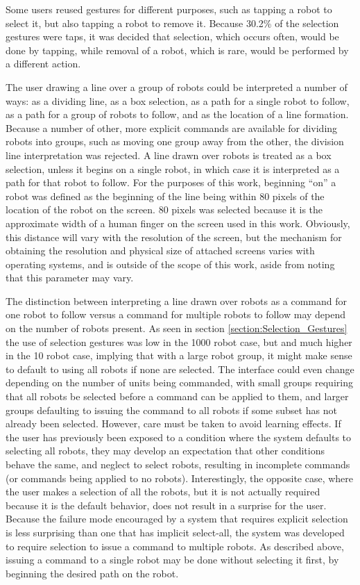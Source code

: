 Some users reused gestures for different purposes, such as tapping a robot to select it, but also tapping a robot to remove it.
Because 30.2\% of the selection gestures were taps, it was decided that selection, which occurs often, would be done by tapping, while removal of a robot, which is rare, would be performed by a different action. 

The user drawing a line over a group of robots could be interpreted a number of ways: as a dividing line, as a box selection, as a path for a single robot to follow, as a path for a group of robots to follow, and as the location of a line formation. 
Because a number of other, more explicit commands are available for dividing robots into groups, such as moving one group away from the other, the division line interpretation was rejected. 
A line drawn over robots is treated as a box selection, unless it begins on a single robot, in which case it is interpreted as a path for that robot to follow. 
For the purposes of this work, beginning ``on'' a robot was defined as the beginning of the line being within 80 pixels of the location of the robot on the screen. 
80 pixels was selected because it is the approximate width of a human finger on the screen used in this work. 
Obviously, this distance will vary with the resolution of the screen, but the mechanism for obtaining the resolution and physical size of attached screens varies with operating systems, and is outside of the scope of this work, aside from noting that this parameter may vary.

The distinction between interpreting a line drawn over robots as a command for one robot to follow versus a command for multiple robots to follow may depend on the number of robots present.
As seen in section \ref{section:Selection_Gestures} the use of selection gestures was low in the 1000 robot case, but and much higher in the 10 robot case, implying that with a large robot group, it might make sense to default to using all robots if none are selected. 
The interface could even change depending on the number of units being commanded, with small groups requiring that all robots be selected before a command can be applied to them, and larger groups defaulting to issuing the command to all robots if some subset has not already been selected. 
However, care must be taken to avoid learning effects. 
If the user has previously been exposed to a condition where the system defaults to selecting all robots, they may develop an expectation that other conditions behave the same, and neglect to select robots, resulting in incomplete commands (or commands being applied to no robots). 
Interestingly, the opposite case, where the user makes a selection of all the robots, but it is not actually required because it is the default behavior, does not result in a surprise for the user. 
Because the failure mode encouraged by a system that requires explicit selection is less surprising than one that has implicit select-all, the system was developed to require selection to issue a command to multiple robots. 
As described above, issuing a command to a single robot may be done without selecting it first, by beginning the desired path on the robot. 

